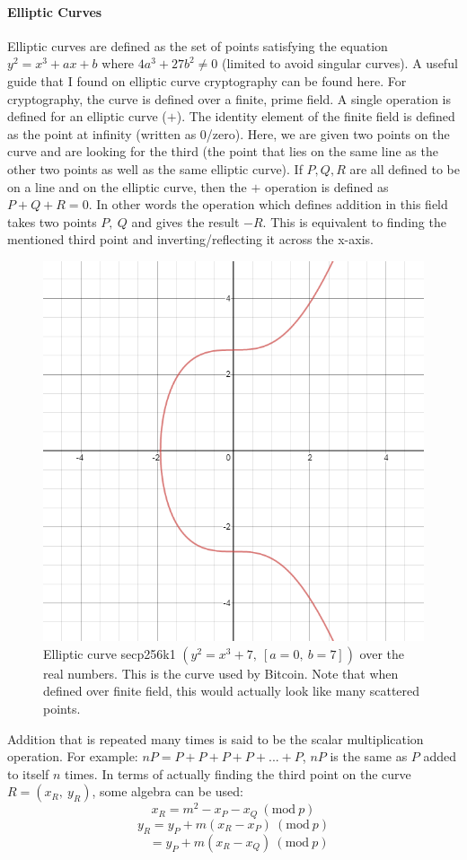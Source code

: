 \documentclass{article}
\begin{document}
\paragraph{Elliptic Curves}
Elliptic curves are defined as the set of points satisfying the equation $y^2 = x^3+ax+b$ where $4a^3 + 27b^2 \not= 0$ (limited to avoid singular curves). A useful guide that I found on elliptic curve cryptography can be found here\cite{ec_guide}. For cryptography, the curve is defined over a finite, prime field. A single operation is defined for an elliptic curve ($+$). The identity element of the finite field is defined as the point at infinity (written as 0/zero). Here, we are given two points on the curve and are looking for the third (the point that lies on the same line as the other two points as well as the same elliptic curve). If $P,Q,R$ are all defined to be on a line and on the elliptic curve, then the $+$ operation is defined as $P+Q+R=0$. In other words the operation which defines addition in this field takes two points $P,\ Q$ and gives the result $-R$. This is equivalent to finding the mentioned third point and inverting/reflecting it across the x-axis. 
\begin{figure}[h]
    \centering
    \includegraphics[width=0.5\linewidth]{Images/Secp256k1.png}
    \caption{Elliptic curve secp256k1 $(y^2=x^3+7,\ [a=0,\ b=7])$ over the real numbers. This is the curve used by Bitcoin. Note that when defined over finite field, this would actually look like many scattered points.}
    \label{fig:secp256k1}
\end{figure}

Addition that is repeated many times is said to be the scalar multiplication operation. For example: $nP = P+P+P+P+...+P$, $nP$ is the same as $P$ added to itself $n$ times.
In terms of actually finding the third point on the curve $R=(x_R,\ y_R)$, some algebra can be used:
\[x_R=m^2-x_P-x_Q\ (\textrm{mod}\ p)\]
\[y_R=y_P+m(x_R-x_P)\ (\textrm{mod}\ p)\]
\[\ \ \ \ =y_P+m(x_R-x_Q)\ (\textrm{mod}\ p)\]
\end{document}
